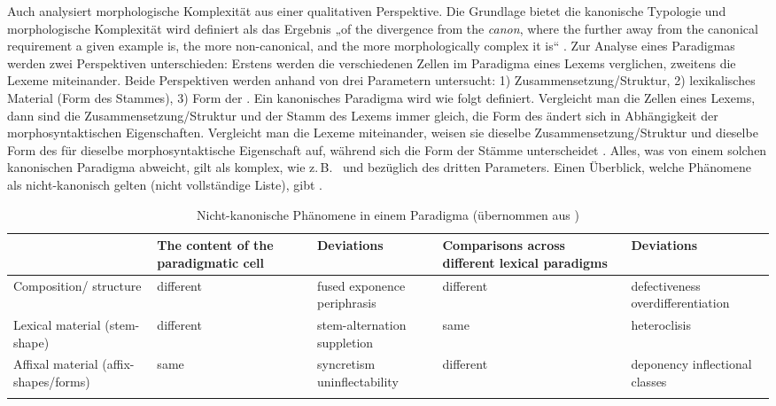 \begin{exe}
\begin{exe}
Auch {\citet{Camilleri2012}} analysiert morphologische Komplexität aus einer qualitativen Perspektive. Die Grundlage bietet die kanonische Typologie und morphologische Komplexität wird definiert als das Ergebnis „of the divergence from the \textit{canon}, where the further away from the canonical requirement a given example is, the more non-canonical, and the more morphologically complex it is“ \citep[93]{Camilleri2012}. Zur Analyse eines Paradigmas werden zwei Perspektiven unterschieden: Erstens werden die verschiedenen Zellen im Paradigma eines Lexems verglichen, zweitens die Lexeme miteinander. Beide Perspektiven werden anhand von drei Parametern untersucht: 1) Zusammensetzung/Struktur, 2) lexikalisches Material (Form des Stammes), 3) Form der  \citep[94]{Camilleri2012}. Ein kanonisches Paradigma wird wie folgt definiert. Vergleicht man die Zellen eines Lexems, dann sind die Zusammensetzung/Struktur und der Stamm des Lexems immer gleich, die Form des  ändert sich in Abhängigkeit der morphosyntaktischen Eigenschaften. Vergleicht man die Lexeme miteinander, weisen sie dieselbe Zusammensetzung/Struktur und dieselbe Form des  für dieselbe morphosyntaktische Eigenschaft auf, während sich die Form der Stämme unterscheidet \citep[94]{Camilleri2012}. Alles, was von einem solchen kanonischen Paradigma abweicht, gilt als komplex, wie z.\,B.\  und  bezüglich des dritten Parameters. Einen Überblick, welche Phänomene als nicht-kanonisch gelten (nicht vollständige Liste), gibt .


\begin{table}
\caption{Nicht-kanonische Phänomene in einem Paradigma (übernommen aus \citealt[95]{Camilleri2012})}\label{table4.13}
\begin{tabularx}{\textwidth}{QQQQQ} 
\lsptoprule
& {The content of the paradigmatic cell} & {Deviations} & {Comparisons across different lexical paradigms} & {Deviations}\\
\midrule
{Composition/ structure} & different & fused exponence periphrasis & different & defectiveness
overdifferentiation\\
\midrule
{Lexical material (stem-shape)} & different & stem-alternation
suppletion & same & heteroclisis\\
\midrule
{Affixal material (affix-shapes\slash forms)} & same & syncretism uninflectability & different & deponency inflectional classes\\
\lspbottomrule
\end{tabularx}
\end{table}


\end{exe}
\end{exe}
